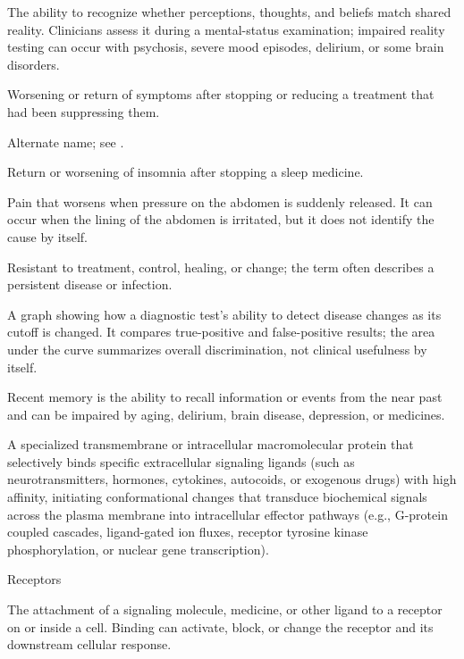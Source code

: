  The ability to recognize whether perceptions, thoughts, and beliefs match shared reality. Clinicians assess it during a mental-status examination; impaired reality testing can occur with psychosis, severe mood episodes, delirium, or some brain disorders.

 Worsening or return of symptoms after stopping or reducing a treatment that had been suppressing them.

 Alternate name; see .

 Return or worsening of insomnia after stopping a sleep medicine.

 Pain that worsens when pressure on the abdomen is suddenly released. It can occur when the lining of the abdomen is irritated, but it does not identify the cause by itself.

 Resistant to treatment, control, healing, or change; the term often describes a persistent disease or infection.

 A graph showing how a diagnostic test’s ability to detect disease changes as its cutoff is changed. It compares true-positive and false-positive results; the area under the curve summarizes overall discrimination, not clinical usefulness by itself.

 Recent memory is the ability to recall information or events from the near past and can be impaired by aging, delirium, brain disease, depression, or medicines.

 A specialized transmembrane or intracellular macromolecular protein that selectively binds specific extracellular signaling ligands (such as neurotransmitters, hormones, cytokines, autocoids, or exogenous drugs) with high affinity, initiating conformational changes that transduce biochemical signals across the plasma membrane into intracellular effector pathways (e.g., G-protein coupled cascades, ligand-gated ion fluxes, receptor tyrosine kinase phosphorylation, or nuclear gene transcription).

\synonyms
Receptors

 The attachment of a signaling molecule, medicine, or other ligand to a receptor on or inside a cell. Binding can activate, block, or change the receptor and its downstream cellular response.

